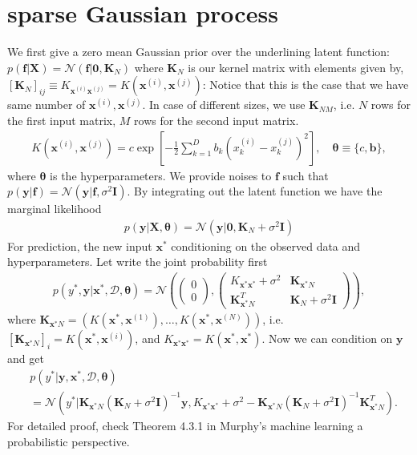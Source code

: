 \documentclass[10pt,a4paper]{article}
\begin{document}
\section{sparse Gaussian process}
We first give a zero mean Gaussian prior over the underlining latent function: $p(\pmb{f}|\pmb{X})=\mathcal{N}(\pmb{f}|\pmb{0},\pmb{K}_N)$ where $\pmb{K}_N$ is our kernel matrix with elements given by, $[\pmb{K}_N]_{ij}\equiv K_{\pmb{x}^{(i)}\pmb{x}^{(j)}}=K(\pmb{x}^{(i)},\pmb{x}^{(j)})$: Notice that this is the case that we have same number of $\pmb{x}^{(i)},\pmb{x}^{(j)}$. In case of different sizes, we use $\pmb{K}_{NM}$, i.e. $N$ rows for the first input matrix, $M$ rows for the second input matrix.
\begin{align}
K(\pmb{x}^{(i)},\pmb{x}^{(j)})=c\exp [-\frac{1}{2}\sum_{k=1}^{D}b_k(x^{(i)}_k-x^{(j)}_k)^2], \quad\pmb{\theta}\equiv \lbrace c,\pmb{b}\rbrace,
\end{align}
where $\pmb{\theta}$ is the hyperparameters.
We provide noises to $\pmb{f}$ such that $p(\pmb{y}|\pmb{f})=\mathcal{N}(\pmb{y}|\pmb{f},\sigma^2\pmb{I})$. By integrating out the latent function we have the marginal likelihood
\begin{align}
p(\pmb{y}|\pmb{X},\pmb{\theta})=\mathcal{N}(\pmb{y}|\pmb{0},\pmb{K}_N+\sigma^2\pmb{I})
\end{align}
For prediction, the new input $\pmb{x}^*$ conditioning on the observed data and hyperparameters. Let write the joint probability first
\begin{align}
p(y^*,\pmb{y}|\pmb{x}^*,\mathcal{D},\pmb{\theta})=\mathcal{N}\left(\begin{pmatrix}
0\\0
\end{pmatrix},\begin{pmatrix}
K_{\pmb{x}^*\pmb{x}^*}+\sigma^2 & \pmb{K}_{\pmb{x}^*N}\\
\pmb{K}_{\pmb{x}^*N}^T & \pmb{K}_N+\sigma^2\pmb{I} 
\end{pmatrix}\right),
\label{cgjoint}
\end{align}
where $\pmb{K}_{\pmb{x}^*N}=(K(\pmb{x}^*,\pmb{x}^{(1)}),\dots,K(\pmb{x}^*,\pmb{x}^{(N)}))$, i.e. $[\pmb{K}_{\pmb{x}^*N}]_{i}=K(\pmb{x}^*,\pmb{x}^{(i)})$, and $K_{\pmb{x}^*\pmb{x}^*}=K(\pmb{x}^*,\pmb{x}^*)$. 
Now we can condition on $\pmb{y}$ and get
\begin{align}
&p(y^*|\pmb{y},\pmb{x}^*,\mathcal{D},\pmb{\theta})\nonumber\\
&=\mathcal{N}(y^*|\pmb{K}_{\pmb{x}^*N}(\pmb{K}_N+\sigma^2\pmb{I})^{-1}\pmb{y},K_{\pmb{x}^*\pmb{x}^*}+\sigma^2-\pmb{K}_{\pmb{x}^*N}(\pmb{K}_N+\sigma^2\pmb{I})^{-1}\pmb{K}_{\pmb{x}^*N}^T).
\label{cgcondition}
\end{align}
For detailed proof, check Theorem 4.3.1 in Murphy's machine learning a probabilistic perspective.
\end{document}
